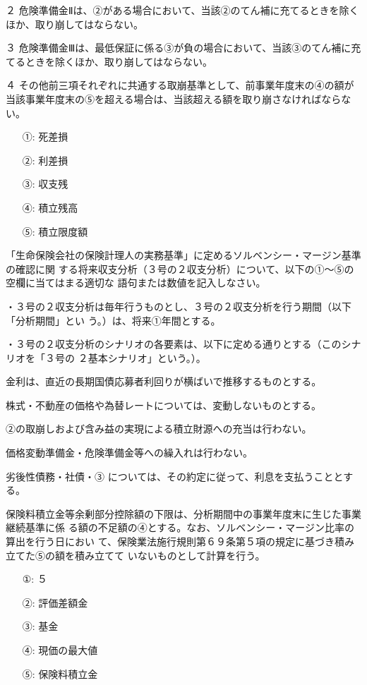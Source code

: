 \documentclass[report,gutter=10mm,fore-edge=10mm,uplatex,dvipdfmx]{jlreq}
\begin{document}
２ 危険準備金Ⅱは、②がある場合において、当該②のてん補に充てるときを除くほか、取り崩してはならない。

３ 危険準備金Ⅲは、最低保証に係る③が負の場合において、当該③のてん補に充てるときを除くほか、取り崩してはならない。

４ その他前三項それぞれに共通する取崩基準として、前事業年度末の④の額が当該事業年度末の⑤を超える場合は、当該超える額を取り崩さなければならない。

\answer{}
\begin{itemize}
\item[ ①: ] 死差損
\item[ ②: ] 利差損
\item[ ③: ] 収支残
\item[ ④: ] 積立残高
\item[ ⑤: ] 積立限度額
\end{itemize}


「生命保険会社の保険計理人の実務基準」に定めるソルベンシー・マージン基準の確認に関
する将来収支分析（３号の２収支分析）について、以下の①～⑤の空欄に当てはまる適切な
語句または数値を記入しなさい。

・３号の２収支分析は毎年行うものとし、３号の２収支分析を行う期間（以下「分析期間」とい
う。）は、将来①年間とする。

・３号の２収支分析のシナリオの各要素は、以下に定める通りとする（このシナリオを「３号の
２基本シナリオ」という。）。

 金利は、直近の長期国債応募者利回りが横ばいで推移するものとする。

 株式・不動産の価格や為替レートについては、変動しないものとする。

②の取崩しおよび含み益の実現による積立財源への充当は行わない。

 価格変動準備金・危険準備金等への繰入れは行わない。

 劣後性債務・社債・③
については、その約定に従って、利息を支払うこととする。

保険料積立金等余剰部分控除額の下限は、分析期間中の事業年度末に生じた事業継続基準に係
る額の不足額の④とする。なお、ソルベンシー・マージン比率の算出を行う日におい
て、保険業法施行規則第６９条第５項の規定に基づき積み立てた⑤の額を積み立てて
いないものとして計算を行う。

\answer{}
\begin{itemize}
 \item[①: ]  ５ 
 \item[②: ]  評価差額金 
 \item[③: ]  基金 
 \item[④: ]  現価の最大値 
 \item[⑤: ]  保険料積立金 
\end{itemize}
\end{document}
